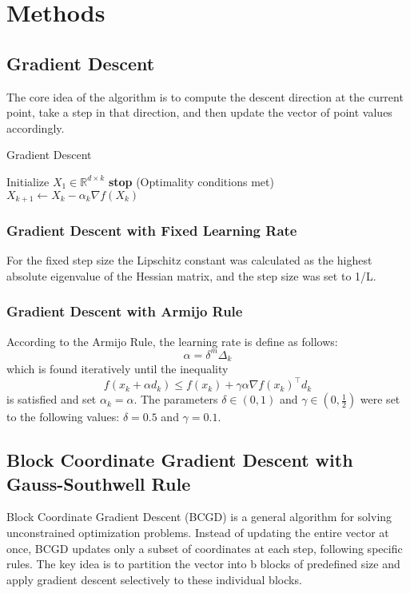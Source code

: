 \documentclass{article}
\begin{document}
\section{Methods}
\subsection{Gradient Descent}
The core idea of the algorithm is to compute the descent direction at the current point, take a step in that direction, and then update the vector of point values accordingly.
\begin{algorithm}
\caption{Gradient Descent}\label{alg:full_gd}
\begin{algorithmic}[1]
\State Initialize $X_1 \in \mathbb{R}^{d \times k}$
        \State \textbf{stop} (Optimality conditions met)
    \Else
        \State $X_{k+1} \gets X_k - \alpha_k \nabla f(X_k)$
    \EndIf
\EndFor
\end{algorithmic}
\end{algorithm}

\subsubsection{Gradient Descent with Fixed Learning Rate}
For the fixed step size the Lipschitz constant was calculated as the highest absolute eigenvalue of the Hessian matrix, and the step size was set to 1/L.

\subsubsection{Gradient Descent with Armijo Rule}
According to the Armijo Rule, the learning rate is define as follows:
\[
\alpha = \delta^m \Delta_k
\]
which is found iteratively until the inequality
\[
f(x_k + \alpha d_k) \leq f(x_k) + \gamma \alpha \nabla f(x_k)^\top d_k
\]
is satisfied and set \( \alpha_k = \alpha \).  The parameters \(\delta \in (0, 1)\) and \(\gamma \in \left(0, \frac{1}{2}\right)\) were set to the following values: \(\delta = 0.5 \) and \(\gamma = 0.1\).


\subsection{Block Coordinate Gradient Descent with Gauss-Southwell Rule}

Block Coordinate Gradient Descent (BCGD) is a general algorithm for solving unconstrained optimization problems. Instead of updating the entire vector at once, BCGD updates only a subset of coordinates at each step, following specific rules. The key idea is to partition the vector into b blocks of predefined size and apply gradient descent selectively to these individual blocks.
\end{document}
